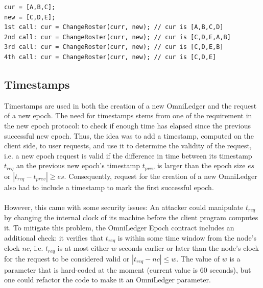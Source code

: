 \begin{lstlisting}[basicstyle=\ttfamily\footnotesize]
cur = [A,B,C]; 
new = [C,D,E];
1st call: cur = ChangeRoster(curr, new); // cur is [A,B,C,D]
2nd call: cur = ChangeRoster(curr, new); // cur is [C,D,E,A,B]
3rd call: cur = ChangeRoster(curr, new); // cur is [C,D,E,B]
4th call: cur = ChangeRoster(curr, new); // cur is [C,D,E]
\end{lstlisting}

\subsection{Timestamps} \label{timestamp}
Timestamps are used in both the creation of a new OmniLedger and the request of a new epoch. The need for timestamps stems from one of the requirement in the new epoch protocol: to check if enough time has elapsed since the previous successful new epoch. Thus, the idea was to add a timestamp, computed on the client side, to user requests, and use it to determine the validity of the request, i.e. a new epoch request is valid if the difference in time between its timestamp $t_{req}$ an the previous new epoch's timestamp $t_{prev}$  is larger than the epoch size $es$ or $|t_{req} - t_{prev}| \geq es$. Consequently, request for the creation of a new OmniLedger also had to include a timestamp to mark the first successful epoch. \\\\
However, this came with some security issues: An attacker could manipulate $t_{req}$ by changing the internal clock of its machine before the client program computes it. To mitigate this problem, the OmniLedger Epoch contract includes an additional check: it verifies that $t_{req}$ is within some time window from the node's clock $nc$, i.e. $t_{req}$ is at most either $w$ seconds earlier or later than the node's clock for the request to be considered valid or $|t_{req} - nc| \leq w$. The value of $w$ is a parameter that is hard-coded at the moment (current value is 60 seconds), but one could refactor the code to make it an OmniLedger parameter.

